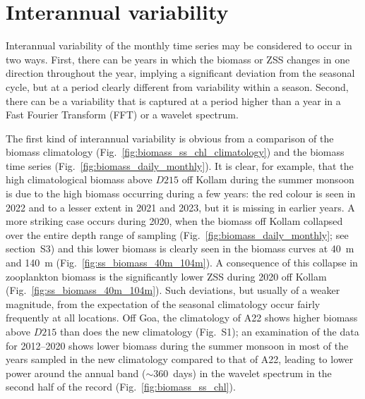 \documentclass[authoryear,review,11pt]{elsarticle}
\begin{document}
\section{Interannual variability}
\label{sec:interannual}

Interannual variability of the monthly time series may be considered to occur in two ways.  First, there can be years in which the biomass or ZSS changes in one direction throughout the year, implying a significant deviation from the seasonal cycle, but at a period clearly different from variability within a season. Second, there can be a variability that is captured at a period higher than a year in a Fast Fourier Transform (FFT) or a wavelet spectrum. 


The first kind of interannual variability is obvious from a comparison of the biomass climatology (Fig.~\ref{fig:biomass_ss_chl_climatology}) and the biomass time series (Fig.~\ref{fig:biomass_daily_monthly}).  It is clear, for example, that the high climatological biomass above $D215$ off Kollam during the summer monsoon is due to the high biomass occurring during a few years: the red colour is seen in 2022 and to a lesser extent in 2021 and 2023, but it is missing in earlier years.  A more striking case occurs during 2020, when the biomass off Kollam collapsed over the entire depth range of sampling (Fig.~\ref{fig:biomass_daily_monthly}; see section~S3) and this lower biomass is clearly seen in the biomass curves at 40~m and 140~m (Fig.~\ref{fig:ss_biomass_40m_104m}). A consequence of this collapse in zooplankton biomass is the  significantly lower ZSS during 2020 off Kollam (Fig.~\ref{fig:ss_biomass_40m_104m}).  Such deviations, but usually of a weaker magnitude, from the expectation of the seasonal climatology occur fairly frequently at all locations.  Off Goa, the climatology of A22 shows higher biomass above $D215$ than does the new climatology (Fig.~S1); an examination of the data for 2012--2020 shows lower biomass during the summer monsoon in most of the years sampled in the new climatology compared to that of A22, leading to lower power around the annual band ($\sim$360~days) in the wavelet spectrum in the second half of the record (Fig.~\ref{fig:biomass_ss_chl}).
\end{document}
